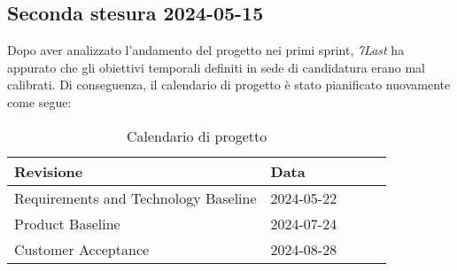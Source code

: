 \subsection{Seconda stesura 2024-05-15}
Dopo aver analizzato l'andamento del progetto nei primi sprint, \textit{7Last} ha appurato che gli obiettivi temporali definiti in sede di candidatura erano mal calibrati. Di conseguenza, il calendario di progetto è stato pianificato nuovamente come segue:
\begin{table}[!h]
    \begin{center}
        \begin{tabular}{ | l | l | l | l | l | }
            \hline
            Revisione                               & Data       \\ \hline
            Requirements and Technology Baseline    & 2024-05-22 \\
            Product Baseline                        & 2024-07-24 \\
            Customer Acceptance                     & 2024-08-28 \\
            \hline
        \end{tabular}
    \end{center}
    \caption{Calendario di progetto}
    \label{tab:11}
\end{table}
